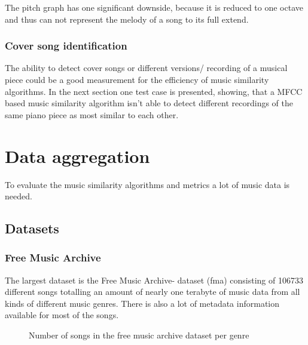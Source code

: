 The pitch graph has one significant downside, because it is reduced to one octave and thus can not represent the melody of a song to its full extend. 

\FloatBarrier

\subsection{Cover song identification}

The ability to detect cover songs or different versions/ recording of a musical piece could be a good measurement for the efficiency of music similarity algorithms. In the next section one test case is presented, showing, that a MFCC based music similarity algorithm isn't able to detect different recordings of the same piano piece as most similar to each other. 

\chapter{Data aggregation}

To evaluate the music similarity algorithms and metrics a lot of music data is needed.

\section{Datasets}

\subsection{Free Music Archive}

The largest dataset is the Free Music Archive- dataset (fma) consisting of 106733 different songs totalling an amount of nearly one terabyte of music data from all kinds of different music genres.\cite{fma1} There is also a lot of metadata information available for most of the songs.

\begin{figure}[thpb]
	\centering
	\caption{Number of songs in the free music archive dataset per genre}
	\label{fmadist}
\end{figure}
\FloatBarrier


